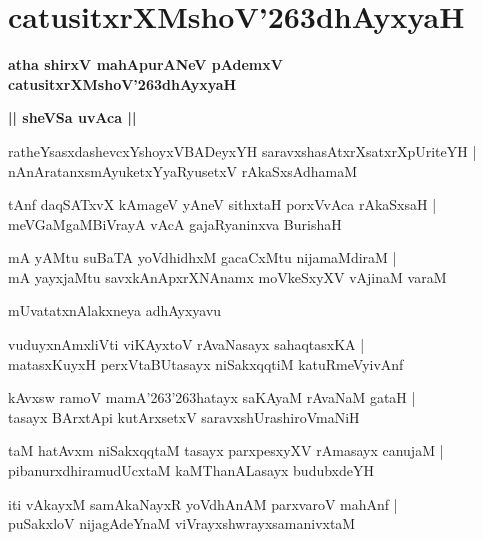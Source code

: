\documentclass[twoside,12pt,openright]{book}
\def\S{\char'263}
\newcounter{shloka}[chapter]
\def\uvaca#1{\centerline{{\large\textbf{#1}}}}
\begin{document}
\chapter{catusitxrXMshoV\S dhAyxyaH}

\begin{center}
{\LARGE\bfseries atha shirxV mahApurANeV pAdemxV catusitxrXMshoV\S dhAyxyaH}
\end{center}

\uvaca{|| sheVSa uvAca ||}

\begin{shloka}%
ratheYsasxdashevcxYshoyxVBADeyxYH saravxshasAtxrXsatxrXpUriteYH |\\
nAnAratanxsmAyuketxYyaRyusetxV rAkaSxsAdhamaM
\end{shloka}

\begin{shloka}%
tAnf daqSATxvX kAmageV yAneV sithxtaH porxVvAca rAkaSxsaH |\\
meVGaMgaMBiVrayA vAcA gajaRyaninxva BurishaH 
\end{shloka}

\begin{shloka}%
mA yAMtu suBaTA yoVdhidhxM gacaCxMtu nijamaMdiraM |\\
mA yayxjaMtu savxkAnApxrXNAnamx moVkeSxyXV vAjinaM varaM 
\end{shloka}

\begin{center}
mUvatatxnAlakxneya adhAyxyavu
\end{center}

\begin{shloka}%
vuduyxnAmxliVti viKAyxtoV rAvaNasayx sahaqtasxKA |\\
matasxKuyxH perxVtaBUtasayx niSakxqqtiM katuRmeVyivAnf 
\end{shloka}

\begin{shloka}%
kAvxsw ramoV mamA\S\S hatayx saKAyaM rAvaNaM gataH |\\
tasayx BArxtApi kutArxsetxV saravxshUrashiroVmaNiH 
\end{shloka}

\begin{shloka}%
taM hatAvxm niSakxqqtaM tasayx parxpesxyXV rAmasayx canujaM |\\
pibanurxdhiramudUcxtaM kaMThanALasayx budubxdeYH 
\end{shloka}

\begin{shloka}%
iti vAkayxM samAkaNayxR yoVdhAnAM parxvaroV mahAnf |\\
puSakxloV nijagAdeYnaM viVrayxshwrayxsamanivxtaM 
\end{shloka}
\end{document}
